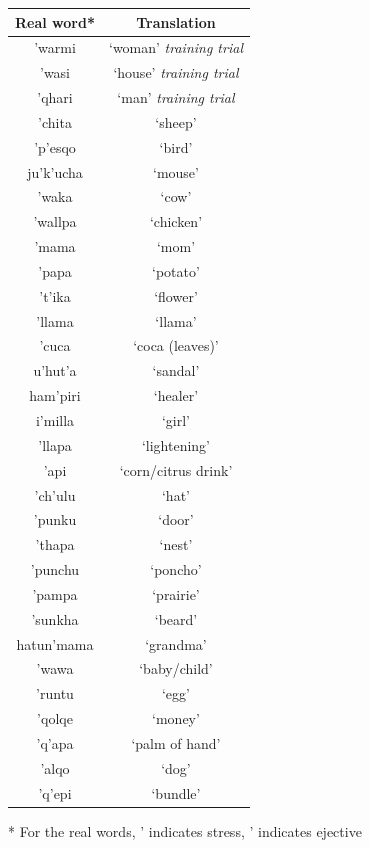 \documentclass[a4paper,man,floatsintext,natbib,donotrepeattitle, apacite]{apa6}
\begin{document}
\begin{table}

\centering
\begin{tabular}{c | c} 
\hline
Real word* & Translation  \\
\hline

\footnotesize{\textsf{'}warmi} & `woman' \textit{training trial}\\
\footnotesize{\textsf{'}wasi} & `house' \textit{training trial} \\
\footnotesize{\textsf{'}qhari} & `man' \textit{training trial}\\
\footnotesize{\textsf{'}chita} & `sheep' \\
\footnotesize{\textsf{'}p'esqo} & `bird' \\
\footnotesize{ju\textsf{'}k'ucha} & `mouse' \\
\footnotesize{\textsf{'}waka} & `cow' \\
\footnotesize{\textsf{'}wallpa} & `chicken' \\
\footnotesize{\textsf{'}mama} & `mom' \\
\footnotesize{\textsf{'}papa} & `potato' \\
\footnotesize{\textsf{'}t'ika} & `flower' \\
\footnotesize{\textsf{'}llama} & `llama' \\
\footnotesize{\textsf{'}cuca} & `coca (leaves)' \\
\footnotesize{u\textsf{'}hut'a} & `sandal' \\
\footnotesize{ham\textsf{'}piri} & `healer' \\
\footnotesize{i\textsf{'}milla} & `girl' \\
\footnotesize{\textsf{'}llapa} & `lightening' \\
\footnotesize{\textsf{'}api} & `corn/citrus drink' \\
\footnotesize{\textsf{'}ch'ulu} & `hat' \\
\footnotesize{\textsf{'}punku} & `door' \\
\footnotesize{\textsf{'}thapa} & `nest' \\
\footnotesize{\textsf{'}punchu} & `poncho' \\
\footnotesize{\textsf{'}pampa} & `prairie' \\
\footnotesize{\textsf{'}sunkha} & `beard' \\
\footnotesize{hatun\textsf{'}mama} & `grandma' \\
\footnotesize{\textsf{'}wawa} & `baby/child' \\
\footnotesize{\textsf{'}runtu} & `egg' \\
\footnotesize{\textsf{'}qolqe} & `money' \\
\footnotesize{\textsf{'}q'apa} & `palm of hand' \\
\footnotesize{\textsf{'}alqo} & `dog' \\
\footnotesize{\textsf{'}q'epi} & `bundle' \\
 \hline

\end{tabular}\par
\smallskip
* For the real words, \textsf{'} indicates stress, ' indicates ejective
\end{table}
\end{document}
